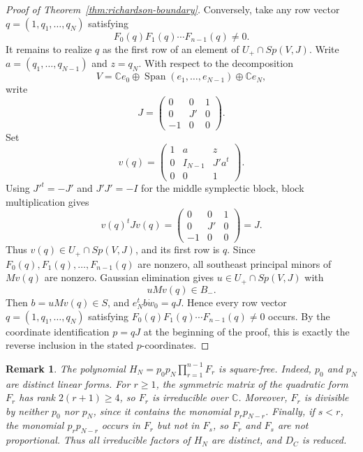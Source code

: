 \documentclass{article}
\newtheorem{rmk}[thm]{Remark}
\newcommand{\CC}{\mathbb{C}}
\begin{document}
\begin{proof}[Proof of Theorem~\ref{thm:richardson-boundary}]
Conversely, take any row vector \(q=(1,q_1,\ldots,q_N)\) satisfying
\[
F_0(q)F_1(q)\cdots F_{n-1}(q)\ne0.
\]
It remains to realize \(q\) as the first row of an element of \(U_+\cap Sp(V,J)\). Write \(a=(q_1,\ldots,q_{N-1})\) and \(z=q_N\). With respect to the decomposition
\[
V=\CC e_0\oplus \operatorname{Span}(e_1,\ldots,e_{N-1})\oplus \CC e_N,
\]
write
\[
J=\begin{pmatrix}
0&0&1\\
0&J'&0\\
-1&0&0
\end{pmatrix}.
\]
Set
\[
v(q)=
\begin{pmatrix}
1&a&z\\
0&I_{N-1}&J'a^t\\
0&0&1
\end{pmatrix}.
\]
Using \(J'^t=-J'\) and \(J'J'=-I\) for the middle symplectic block, block multiplication gives
\[
v(q)^tJv(q)=
\begin{pmatrix}
0&0&1\\
0&J'&0\\
-1&0&0
\end{pmatrix}
=J.
\]
Thus \(v(q)\in U_+\cap Sp(V,J)\), and its first row is \(q\). Since \(F_0(q),F_1(q),\ldots,F_{n-1}(q)\) are nonzero, all southeast principal minors of \(Mv(q)\) are nonzero. Gaussian elimination gives \(u\in U_+\cap Sp(V,J)\) with
\[
uMv(q)\in B_-.
\]
Then \(b=uMv(q)\in S\), and \(e_N^tb\dot w_0=qJ\). Hence every row vector \(q=(1,q_1,\ldots,q_N)\) satisfying \(F_0(q)F_1(q)\cdots F_{n-1}(q)\ne0\) occurs. By the coordinate identification \(p=qJ\) at the beginning of the proof, this is exactly the reverse inclusion in the stated \(p\)-coordinates.
\end{proof}

\begin{rmk}\label{rmk:square-free-boundary}
The polynomial \(H_N=p_0p_N\prod_{r=1}^{n-1}F_r\) is square-free. Indeed, \(p_0\) and \(p_N\) are distinct linear forms. For \(r\ge1\), the symmetric matrix of the quadratic form \(F_r\) has rank \(2(r+1)\ge4\), so \(F_r\) is irreducible over \(\CC\). Moreover, \(F_r\) is divisible by neither \(p_0\) nor \(p_N\), since it contains the monomial \(p_rp_{N-r}\). Finally, if \(s<r\), the monomial \(p_rp_{N-r}\) occurs in \(F_r\) but not in \(F_s\), so \(F_r\) and \(F_s\) are not proportional. Thus all irreducible factors of \(H_N\) are distinct, and \(D_C\) is reduced.
\end{rmk}
\end{document}

